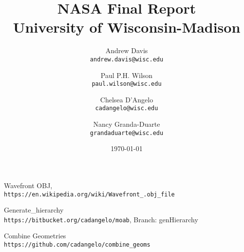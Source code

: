\documentclass[12pt]{article}
\title{
        {NASA Final Report}\\
        {\large University of Wisconsin-Madison}
}
\author{Andrew Davis\\
       \texttt{andrew.davis@wisc.edu}
       \and
       Paul P.H. Wilson\\
       \texttt{paul.wilson@wisc.edu}
       \and
       Chelsea D'Angelo\\
       \texttt{cadangelo@wisc.edu}
       \and
       Nancy Granda-Duarte\\
       \texttt{grandaduarte@wisc.edu}
       }
\date{\today}
\begin{document}
\maketitle
\newpage
\tableofcontents
\newpage
\listoffigures
\newpage
\listoftables
\newpage











\newpage
\appendix


\begin{thebibliography}{9}

Wavefront OBJ,
\\\texttt{https://en.wikipedia.org/wiki/Wavefront\_.obj\_file}

Generate\_hierarchy
\\\texttt{https://bitbucket.org/cadangelo/moab}, Branch: genHierarchy

Combine Geometries
\\\texttt{https://github.com/cadangelo/combine\_geoms}

\end{thebibliography}
\end{document}
